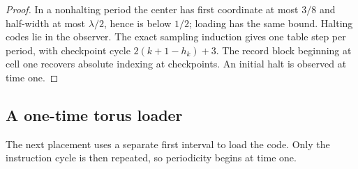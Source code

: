 \begin{proof}
In a nonhalting period the center has first coordinate at most $3/8$
and half-width at most $\lambda/2$, hence is below $1/2$; loading
has the same bound.  Halting codes lie in the observer.  The exact
sampling induction gives one table step per period, with checkpoint
cycle $2(k+1-h_k)+3$.  The record block beginning at cell one
recovers absolute indexing at checkpoints.  An initial halt is
observed at time one.
\end{proof}


\subsection{A one-time torus loader}

The next placement uses a separate first interval to load the code. Only
the instruction cycle is then repeated, so periodicity begins at time one.

